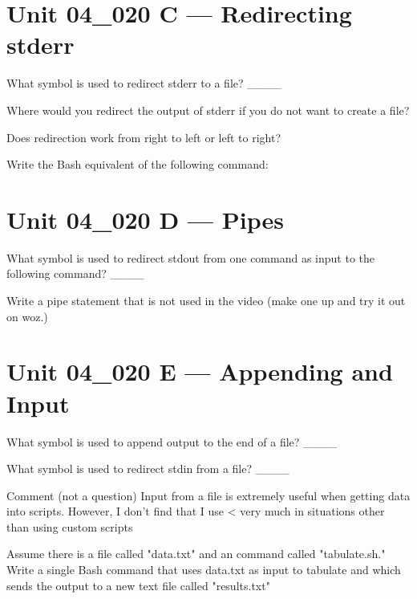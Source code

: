\documentclass[letterpaper,12pt]{exam}
\newcommand{\unit}{Unit 04}
\begin{document}
\begin {questions}
\section*{\unit\_020 C --- Redirecting stderr} %

\question What symbol is used to redirect stderr to a file? \_\_\_\_

\question Where would you redirect the output of stderr if you do not want to create a file?

\question Does redirection work from right to left or left to right?

\question Write the Bash equivalent of the following command:\newline
\centerline{}
\vspace{5mm}

\section*{\unit\_020 D --- Pipes}

\question What symbol is used to redirect stdout from one command as input to the following command? \_\_\_\_

\begin{samepage}
\question Write a pipe statement that is not used in the video (make one up and try it out on woz.) 
\vspace{5mm}
\end{samepage}


\section*{\unit\_020 E --- Appending and Input} %
\question What symbol is used to append output to the end of a file? \_\_\_\_

\question What symbol is used to redirect stdin from a file? \_\_\_\_

\begin{samepage}
\question Comment (not a question)  Input from a file is extremely useful when getting data into scripts.  However, I don't find that I use < very much in situations other than using custom scripts
\vspace{5mm}
\end{samepage}

\begin{samepage}
\question Assume there is a file called "data.txt" and an command called "tabulate.sh."  Write a single Bash command that uses data.txt as input to tabulate and which sends the output to a new text file called "results.txt"  
\vspace{5mm}


\end{samepage}
\end{questions}
\end{document}
